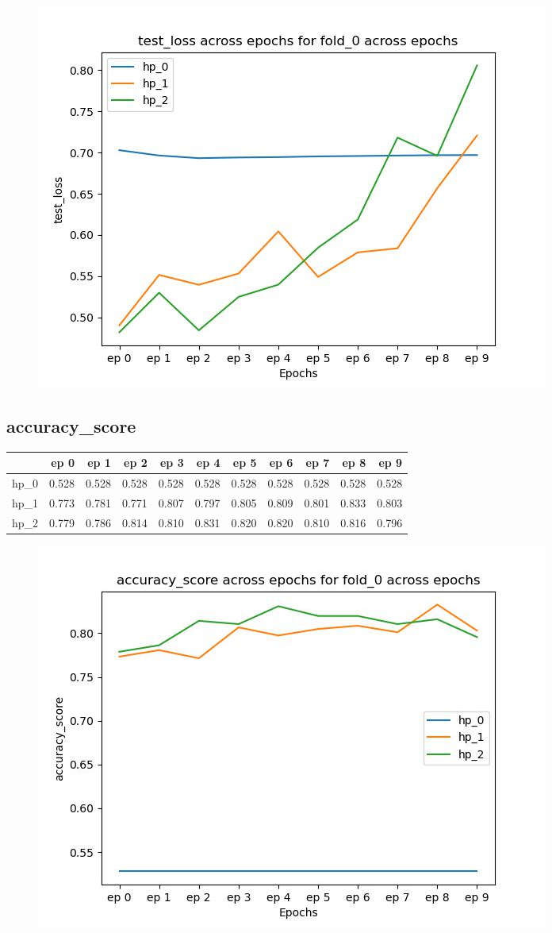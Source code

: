 \documentclass{article}
\begin{document}
\begin{figure}[H]
\includegraphics[scale = 0.75]{fold_0/test_loss}
\end{figure}
\subsection{accuracy\_score}
\begin{tabular}{lrrrrrrrrrr}
\toprule
{} &   ep 0 &   ep 1 &   ep 2 &   ep 3 &   ep 4 &   ep 5 &   ep 6 &   ep 7 &   ep 8 &   ep 9 \\
\midrule
hp\_0 &  0.528 &  0.528 &  0.528 &  0.528 &  0.528 &  0.528 &  0.528 &  0.528 &  0.528 &  0.528 \\
hp\_1 &  0.773 &  0.781 &  0.771 &  0.807 &  0.797 &  0.805 &  0.809 &  0.801 &  0.833 &  0.803 \\
hp\_2 &  0.779 &  0.786 &  0.814 &  0.810 &  0.831 &  0.820 &  0.820 &  0.810 &  0.816 &  0.796 \\
\bottomrule
\end{tabular}

\begin{figure}[H]
\includegraphics[scale = 0.75]{fold_0/accuracy_score}
\end{figure}
\end{document}
